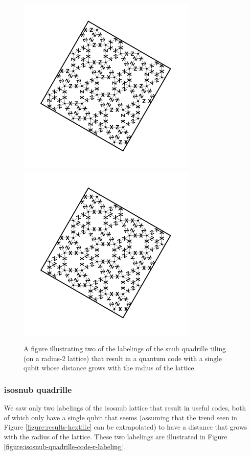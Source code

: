 \documentclass[twocolumn,showpacs,preprintnumbers,amsmath,amssymb,nofootinbib,pra,floatfix]{revtex4-1}
\begin{document}
\begin{figure}
\includegraphics[width=3.5in]{snub-quadrille-code-r-labeling-1} %
\includegraphics[width=3.5in]{snub-quadrille-code-r-labeling-2} %
\caption{
\label{figure:snub-quadrille-code-r-labeling}
A figure illustrating two of the labelings of the snub quadrille tiling (on a radius-2 lattice) that result in a quantum code with a single qubit whose distance grows with the radius of the lattice.
}
\end{figure}
\subsubsection{isosnub quadrille}

We saw only two labelings of the isosnub lattice that result in useful codes, both of which only have a single qubit that seems (assuming that the trend seen in Figure \ref{figure:results-hextille} can be extrapolated) to have a distance that grows with the radius of the lattice.  These two labelings are illustrated in Figure \ref{figure:isosnub-quadrille-code-r-labeling}.
\end{document}
